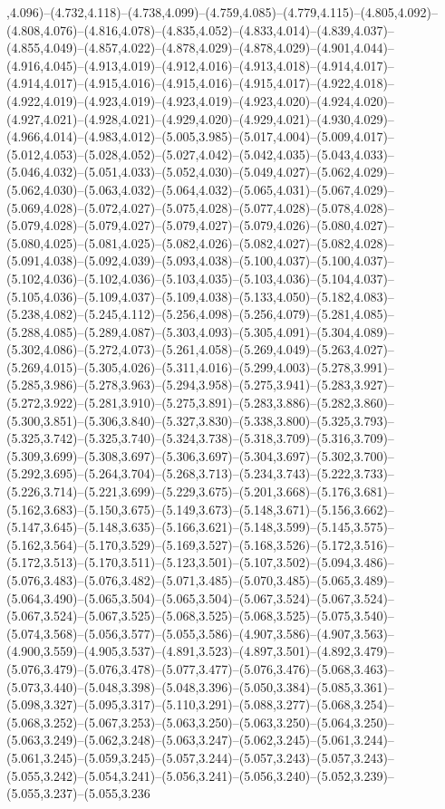 ,4.096)--(4.732,4.118)--(4.738,4.099)--(4.759,4.085)--(4.779,4.115)--(4.805,4.092)--(4.808,4.076)--(4.816,4.078)--(4.835,4.052)--(4.833,4.014)--(4.839,4.037)--(4.855,4.049)--(4.857,4.022)--(4.878,4.029)--(4.878,4.029)--(4.901,4.044)--(4.916,4.045)--(4.913,4.019)--(4.912,4.016)--(4.913,4.018)--(4.914,4.017)--(4.914,4.017)--(4.915,4.016)--(4.915,4.016)--(4.915,4.017)--(4.922,4.018)--(4.922,4.019)--(4.923,4.019)--(4.923,4.019)--(4.923,4.020)--(4.924,4.020)--(4.927,4.021)--(4.928,4.021)--(4.929,4.020)--(4.929,4.021)--(4.930,4.029)--(4.966,4.014)--(4.983,4.012)--(5.005,3.985)--(5.017,4.004)--(5.009,4.017)--(5.012,4.053)--(5.028,4.052)--(5.027,4.042)--(5.042,4.035)--(5.043,4.033)--(5.046,4.032)--(5.051,4.033)--(5.052,4.030)--(5.049,4.027)--(5.062,4.029)--(5.062,4.030)--(5.063,4.032)--(5.064,4.032)--(5.065,4.031)--(5.067,4.029)--(5.069,4.028)--(5.072,4.027)--(5.075,4.028)--(5.077,4.028)--(5.078,4.028)--(5.079,4.028)--(5.079,4.027)--(5.079,4.027)--(5.079,4.026)--(5.080,4.027)--(5.080,4.025)--(5.081,4.025)--(5.082,4.026)--(5.082,4.027)--(5.082,4.028)--(5.091,4.038)--(5.092,4.039)--(5.093,4.038)--(5.100,4.037)--(5.100,4.037)--(5.102,4.036)--(5.102,4.036)--(5.103,4.035)--(5.103,4.036)--(5.104,4.037)--(5.105,4.036)--(5.109,4.037)--(5.109,4.038)--(5.133,4.050)--(5.182,4.083)--(5.238,4.082)--(5.245,4.112)--(5.256,4.098)--(5.256,4.079)--(5.281,4.085)--(5.288,4.085)--(5.289,4.087)--(5.303,4.093)--(5.305,4.091)--(5.304,4.089)--(5.302,4.086)--(5.272,4.073)--(5.261,4.058)--(5.269,4.049)--(5.263,4.027)--(5.269,4.015)--(5.305,4.026)--(5.311,4.016)--(5.299,4.003)--(5.278,3.991)--(5.285,3.986)--(5.278,3.963)--(5.294,3.958)--(5.275,3.941)--(5.283,3.927)--(5.272,3.922)--(5.281,3.910)--(5.275,3.891)--(5.283,3.886)--(5.282,3.860)--(5.300,3.851)--(5.306,3.840)--(5.327,3.830)--(5.338,3.800)--(5.325,3.793)--(5.325,3.742)--(5.325,3.740)--(5.324,3.738)--(5.318,3.709)--(5.316,3.709)--(5.309,3.699)--(5.308,3.697)--(5.306,3.697)--(5.304,3.697)--(5.302,3.700)--(5.292,3.695)--(5.264,3.704)--(5.268,3.713)--(5.234,3.743)--(5.222,3.733)--(5.226,3.714)--(5.221,3.699)--(5.229,3.675)--(5.201,3.668)--(5.176,3.681)--(5.162,3.683)--(5.150,3.675)--(5.149,3.673)--(5.148,3.671)--(5.156,3.662)--(5.147,3.645)--(5.148,3.635)--(5.166,3.621)--(5.148,3.599)--(5.145,3.575)--(5.162,3.564)--(5.170,3.529)--(5.169,3.527)--(5.168,3.526)--(5.172,3.516)--(5.172,3.513)--(5.170,3.511)--(5.123,3.501)--(5.107,3.502)--(5.094,3.486)--(5.076,3.483)--(5.076,3.482)--(5.071,3.485)--(5.070,3.485)--(5.065,3.489)--(5.064,3.490)--(5.065,3.504)--(5.065,3.504)--(5.067,3.524)--(5.067,3.524)--(5.067,3.524)--(5.067,3.525)--(5.068,3.525)--(5.068,3.525)--(5.075,3.540)--(5.074,3.568)--(5.056,3.577)--(5.055,3.586)--(4.907,3.586)--(4.907,3.563)--(4.900,3.559)--(4.905,3.537)--(4.891,3.523)--(4.897,3.501)--(4.892,3.479)--(5.076,3.479)--(5.076,3.478)--(5.077,3.477)--(5.076,3.476)--(5.068,3.463)--(5.073,3.440)--(5.048,3.398)--(5.048,3.396)--(5.050,3.384)--(5.085,3.361)--(5.098,3.327)--(5.095,3.317)--(5.110,3.291)--(5.088,3.277)--(5.068,3.254)--(5.068,3.252)--(5.067,3.253)--(5.063,3.250)--(5.063,3.250)--(5.064,3.250)--(5.063,3.249)--(5.062,3.248)--(5.063,3.247)--(5.062,3.245)--(5.061,3.244)--(5.061,3.245)--(5.059,3.245)--(5.057,3.244)--(5.057,3.243)--(5.057,3.243)--(5.055,3.242)--(5.054,3.241)--(5.056,3.241)--(5.056,3.240)--(5.052,3.239)--(5.055,3.237)--(5.055,3.236